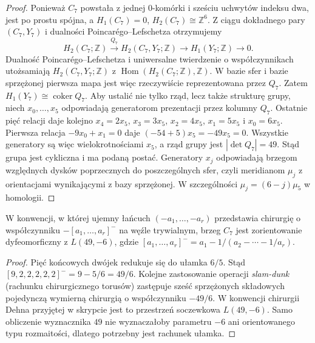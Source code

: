 \begin{proof}
Ponieważ $C_7$ powstała z jednej $0$-komórki i sześciu
uchwytów indeksu dwa, jest po prostu spójna, a
$H_1(C_7)=0$, $H_2(C_7)\cong\mathbb Z^6$. Z ciągu
dokładnego pary $(C_7,Y_7)$ i dualności Poincarégo--Lefschetza
otrzymujemy
\[
H_2(C_7;\mathbb Z)\xrightarrow{Q_7}
H_2(C_7,Y_7;\mathbb Z)\longrightarrow
H_1(Y_7;\mathbb Z)\longrightarrow0.
\]
Dualność Poincarégo--Lefschetza i uniwersalne
twierdzenie o współczynnikach utożsamiają
$H_2(C_7,Y_7;\mathbb Z)$ z
$\operatorname{Hom}(H_2(C_7;\mathbb Z),\mathbb Z)$.
W bazie sfer i bazie sprzężonej pierwsza mapa
jest więc rzeczywiście reprezentowana przez $Q_7$.
Zatem $H_1(Y_7)\cong\operatorname{coker}Q_7$.
Aby ustalić nie tylko rząd, lecz także strukturę grupy,
niech $x_0,\ldots,x_5$ odpowiadają generatorom prezentacji
przez kolumny $Q_7$. Ostatnie pięć relacji daje kolejno
$x_4=2x_5$, $x_3=3x_5$, $x_2=4x_5$,
$x_1=5x_5$ i $x_0=6x_5$.
Pierwsza relacja $-9x_0+x_1=0$ daje
$(-54+5)x_5=-49x_5=0$.
Wszystkie generatory są więc wielokrotnościami $x_5$,
a rząd grupy jest $|\det Q_7|=49$. Stąd grupa jest
cykliczna i ma podaną postać. Generatory $x_j$
odpowiadają brzegom względnych dysków poprzecznych
do poszczególnych sfer, czyli meridianom $\mu_j$
z orientacjami wynikającymi z bazy sprzężonej.
W szczególności $\mu_j=(6-j)\mu_5$ w homologii.
\end{proof}

\begin{stwierdzenie}
\label{prop:tg-park-lens}
W konwencji, w której ujemny łańcuch $(-a_1,\ldots,-a_r)$
przedstawia chirurgię o współczynniku
$- [a_1,\ldots,a_r]^-$ na węźle trywialnym,
brzeg $C_7$ jest zorientowanie dyfeomorficzny z
$L(49,-6)$, gdzie
$[a_1,\ldots,a_r]^-=a_1-1/(a_2-\cdots-1/a_r)$.
\end{stwierdzenie}

\begin{proof}
Pięć końcowych dwójek redukuje się do ułamka $6/5$.
Stąd $[9,2,2,2,2,2]^-=9-5/6=49/6$.
Kolejne zastosowanie operacji \emph{slam-dunk}
(rachunku chirurgicznego torusów) zastępuje sześć
sprzężonych składowych pojedynczą wymierną chirurgią
o współczynniku $-49/6$. W konwencji chirurgii Dehna
przyjętej w skrypcie jest to przestrzeń soczewkowa
$L(49,-6)$. Samo obliczenie wyznacznika $49$ nie
wyznaczałoby parametru $-6$ ani orientowanego typu
rozmaitości, dlatego potrzebny jest rachunek ułamka.
\end{proof}

